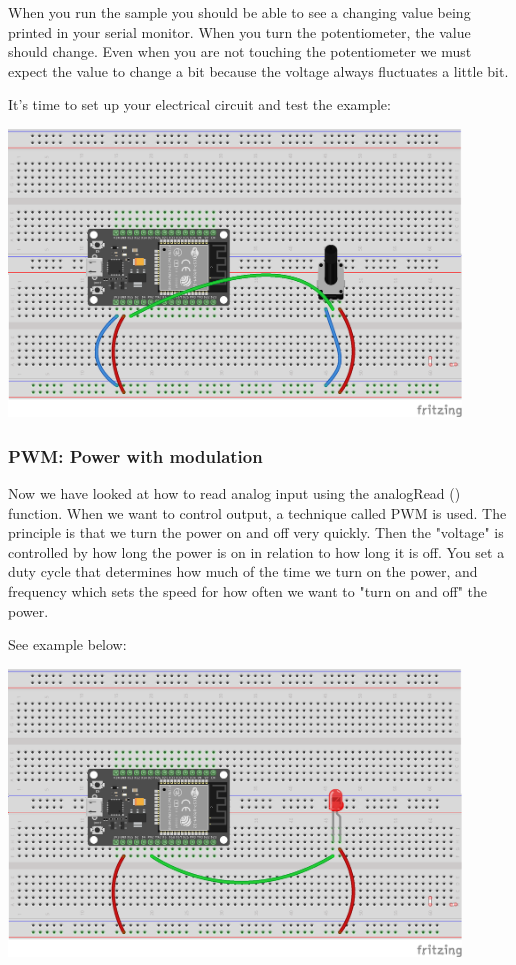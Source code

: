 \documentclass[12pt, a4paper]{article}
\begin{document}
When you run the sample you should be able to see a changing value being printed in your serial monitor. When you turn the potentiometer, the value should change. Even when you are not touching the potentiometer we must expect the value to change a bit because the voltage always fluctuates a little bit.

It's time to set up your electrical circuit and test the example:
\begin{center}
  \includegraphics[width=12cm, keepaspectratio]{fritzing/analogInput_potentiometer.png}
\end{center}



\subsubsection{PWM: Power with modulation}

Now we have looked at how to read analog input using the analogRead () function. When we want to control output, a technique called PWM is used. The principle is that we turn the power on and off very quickly. Then the "voltage" is controlled by how long the power is on in relation to how long it is off.
You set a duty cycle that determines how much of the time we turn on the power, and frequency which sets the speed for how often we want to "turn on and off" the power.

See example below:
\begin{center}
  \includegraphics[width=12cm, keepaspectratio]{fritzing/pwm_led.png}
\end{center}


\end{document}
